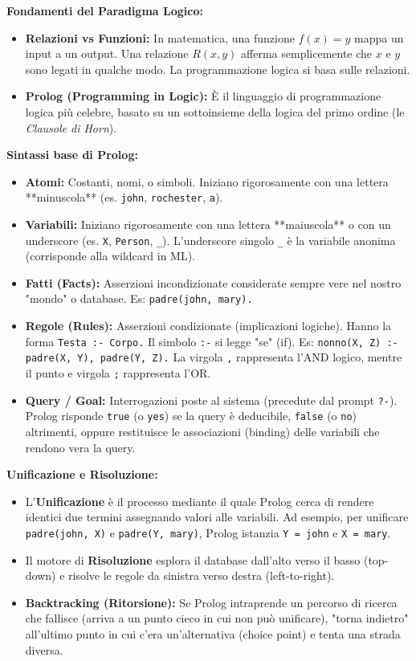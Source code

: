 \documentclass[12pt, a4paper]{article}
\begin{document}
\newpage

\textbf{Fondamenti del Paradigma Logico:}
\begin{itemize}
    \item \textbf{Relazioni vs Funzioni:} In matematica, una funzione $f(x) = y$ mappa un input a un output. Una relazione $R(x, y)$ afferma semplicemente che $x$ e $y$ sono legati in qualche modo. La programmazione logica si basa sulle relazioni.
    \item \textbf{Prolog (Programming in Logic):} È il linguaggio di programmazione logica più celebre, basato su un sottoinsieme della logica del primo ordine (le \textit{Clausole di Horn}).
\end{itemize}

\textbf{Sintassi base di Prolog:}
\begin{itemize}
    \item \textbf{Atomi:} Costanti, nomi, o simboli. Iniziano rigorosamente con una lettera **minuscola** (es. \texttt{john}, \texttt{rochester}, \texttt{a}).
    \item \textbf{Variabili:} Iniziano rigorosamente con una lettera **maiuscola** o con un underscore (es. \texttt{X}, \texttt{Person}, \texttt{\_}). L'underscore singolo \texttt{\_} è la variabile anonima (corrisponde alla wildcard in ML).
    \item \textbf{Fatti (Facts):} Asserzioni incondizionate considerate sempre vere nel nostro "mondo" o database. 
    Es: \texttt{padre(john, mary).}
    \item \textbf{Regole (Rules):} Asserzioni condizionate (implicazioni logiche). Hanno la forma \texttt{Testa :- Corpo.} Il simbolo \texttt{:-} si legge "se" (if). 
    Es: \texttt{nonno(X, Z) :- padre(X, Y), padre(Y, Z).} 
    La virgola \texttt{,} rappresenta l'AND logico, mentre il punto e virgola \texttt{;} rappresenta l'OR.
    \item \textbf{Query / Goal:} Interrogazioni poste al sistema (precedute dal prompt \texttt{?-}). Prolog risponde \texttt{true} (o \texttt{yes}) se la query è deducibile, \texttt{false} (o \texttt{no}) altrimenti, oppure restituisce le associazioni (binding) delle variabili che rendono vera la query.
\end{itemize}

\textbf{Unificazione e Risoluzione:}
\begin{itemize}
    \item L'\textbf{Unificazione} è il processo mediante il quale Prolog cerca di rendere identici due termini assegnando valori alle variabili. Ad esempio, per unificare \texttt{padre(john, X)} e \texttt{padre(Y, mary)}, Prolog istanzia \texttt{Y = john} e \texttt{X = mary}.
    \item Il motore di \textbf{Risoluzione} esplora il database dall'alto verso il basso (top-down) e risolve le regole da sinistra verso destra (left-to-right).
    \item \textbf{Backtracking (Ritorsione):} Se Prolog intraprende un percorso di ricerca che fallisce (arriva a un punto cieco in cui non può unificare), "torna indietro" all'ultimo punto in cui c'era un'alternativa (choice point) e tenta una strada diversa.
\end{itemize}
\end{document}
